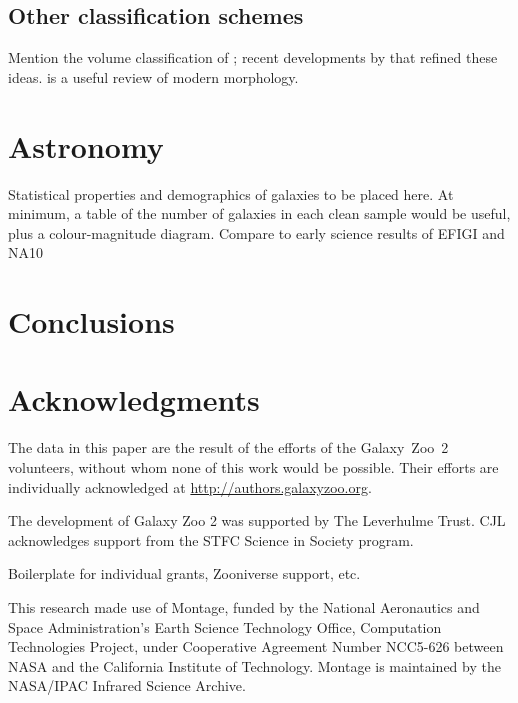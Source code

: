 \documentclass[useAMS,usenatbib]{mn2e}
\begin{document}
\subsection{Other classification schemes}

Mention the volume classification of \citet{dev59}; recent developments by \citet{kor12,lau11,cap11,kra11} that refined these ideas. \citet{but11} is a useful review of modern morphology. 


\section{Astronomy}\label{sec-astronomy}

Statistical properties and demographics of galaxies to be placed here. At minimum, a table of the number of galaxies in each clean sample would be useful, plus a colour-magnitude diagram. Compare to early science results of EFIGI \citep{del11a} and NA10 \citep{nai10a,nai10b}


\section{Conclusions}\label{sec-conclusion}


\section*{Acknowledgments}
The data in this paper are the result of the efforts of the Galaxy~Zoo~2 volunteers, without whom none of this work would be possible. Their efforts are individually acknowledged at \url{http://authors.galaxyzoo.org}. 

The development of Galaxy Zoo 2 was supported by The Leverhulme Trust. CJL acknowledges support from the STFC Science in Society program. 

Boilerplate for individual grants, Zooniverse support, etc.

This research made use of Montage, funded by the National Aeronautics and Space Administration's Earth Science Technology Office, Computation Technologies Project, under Cooperative Agreement Number NCC5-626 between NASA and the California Institute of Technology. Montage is maintained by the NASA/IPAC Infrared Science Archive.
\end{document}
